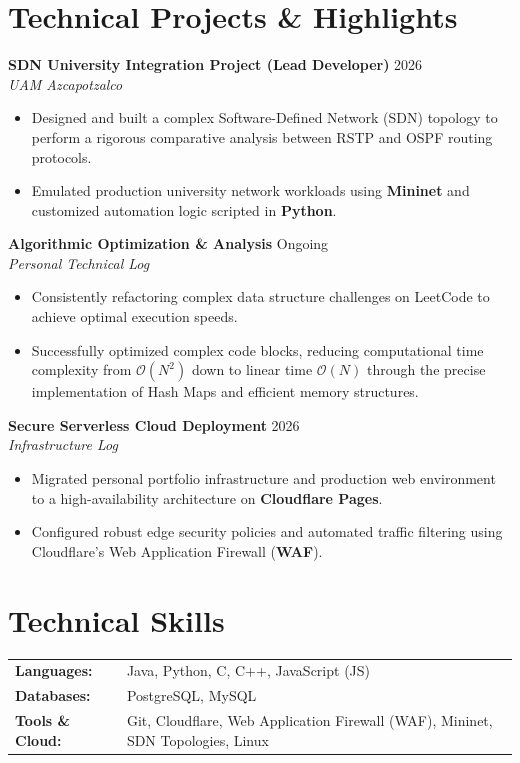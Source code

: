 \documentclass[10pt,a4paper]{article}
\begin{document}
\section{Technical Projects \& Highlights}
\noindent
\textbf{SDN University Integration Project (Lead Developer)} \hfill 2026 \\
\textit{UAM Azcapotzalco} \\
\begin{itemize}
    \item Designed and built a complex Software-Defined Network (SDN) topology to perform a rigorous comparative analysis between RSTP and OSPF routing protocols.
    \item Emulated production university network workloads using \textbf{Mininet} and customized automation logic scripted in \textbf{Python}.
\end{itemize}

\vspace{6pt}
\noindent
\textbf{Algorithmic Optimization \& Analysis} \hfill Ongoing \\
\textit{Personal Technical Log} \\
\begin{itemize}
    \item Consistently refactoring complex data structure challenges on LeetCode to achieve optimal execution speeds.
    \item Successfully optimized complex code blocks, reducing computational time complexity from $\mathcal{O}(N^2)$ down to linear time $\mathcal{O}(N)$ through the precise implementation of Hash Maps and efficient memory structures.
\end{itemize}

\vspace{6pt}
\noindent
\textbf{Secure Serverless Cloud Deployment} \hfill 2026 \\
\textit{Infrastructure Log} \\
\begin{itemize}
    \item Migrated personal portfolio infrastructure and production web environment to a high-availability architecture on \textbf{Cloudflare Pages}.
    \item Configured robust edge security policies and automated traffic filtering using Cloudflare's Web Application Firewall (\textbf{WAF}).
\end{itemize}

\section{Technical Skills}
\noindent
\begin{tabular}{@{}p{1.2in} p{5.2in}@{}}
    \textbf{Languages:} & Java, Python, C, C++, JavaScript (JS) \\
    \textbf{Databases:} & PostgreSQL, MySQL \\
    \textbf{Tools \& Cloud:} & Git, Cloudflare, Web Application Firewall (WAF), Mininet, SDN Topologies, Linux
\end{tabular}
\end{document}
